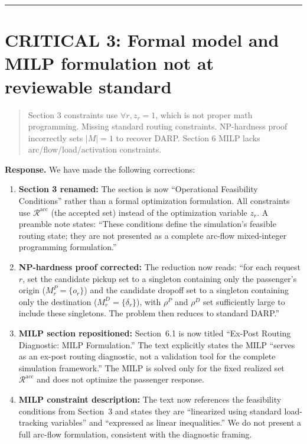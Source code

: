 \documentclass[12pt]{article}
\newenvironment{revcomment}{%
  \begin{quote}\itshape
}{%
  \end{quote}
}
\begin{document}
\bigskip\hrule\bigskip

\section*{CRITICAL 3: Formal model and MILP formulation not at reviewable standard}

\begin{revcomment}
Section 3 constraints use $\forall r, z_r=1$, which is not proper math programming. Missing standard routing constraints. NP-hardness proof incorrectly sets $|M|=1$ to recover DARP. Section 6 MILP lacks arc/flow/load/activation constraints.
\end{revcomment}

\textbf{Response.} We have made the following corrections:

\begin{enumerate}
  \item \textbf{Section 3 renamed:} The section is now ``Operational Feasibility Conditions'' rather than a formal optimization formulation. All constraints use $\mathcal{R}^{\text{acc}}$ (the accepted set) instead of the optimization variable $z_r$. A preamble note states: ``These conditions define the simulation's feasible routing state; they are not presented as a complete arc-flow mixed-integer programming formulation.''

  \item \textbf{NP-hardness proof corrected:} The reduction now reads: ``for each request $r$, set the candidate pickup set to a singleton containing only the passenger's origin ($M_r^P = \{o_r\}$) and the candidate dropoff set to a singleton containing only the destination ($M_r^D = \{\delta_r\}$), with $\rho^P$ and $\rho^D$ set sufficiently large to include these singletons. The problem then reduces to standard DARP.''

  \item \textbf{MILP section repositioned:} Section~6.1 is now titled ``Ex-Post Routing Diagnostic: MILP Formulation.'' The text explicitly states the MILP ``serves as an ex-post routing diagnostic, not a validation tool for the complete simulation framework.'' The MILP is solved only for the fixed realized set $\mathcal{R}^{\text{acc}}$ and does not optimize the passenger response.

  \item \textbf{MILP constraint description:} The text now references the feasibility conditions from Section~3 and states they are ``linearized using standard load-tracking variables'' and ``expressed as linear inequalities.'' We do not present a full arc-flow formulation, consistent with the diagnostic framing.
\end{enumerate}
\end{document}
